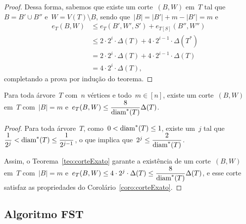 \begin{proof}
			Dessa forma, sabemos que existe um corte~$(B,W)$ em~$T$ tal
			que~${B=B'\cup B''}$ e~${W=V(T)\setminus B}$, sendo 
			que~${|B|=|B'| + m-|B'| = m}$ e
			\begin{align}
				e_T(B,W)&\le e_T(B',W',S') + e_{T[S]}(B'',W'') 
				\nonumber\\
				&\le 2\cdot2^i\cdot\Delta(T) + 4\cdot 2^{i-1}\cdot
				\Delta(T^*)\nonumber\\
				&= 2\cdot2^i\cdot\Delta(T) + 4\cdot 2^{i-1}\cdot
				\Delta(T)\nonumber\\
				&= 4\cdot 2^{i}\cdot\Delta(T), \nonumber
			\end{align}
			completando a prova por indução do teorema.
	\end{proof}

	\bigskip
	\bigskip

	\begin{coro}
	\label{coro:corteExato}
		Para toda árvore~$T$ com~$n$ vértices e todo~${m\in[n]}$, existe
		um corte~$(B,W)$ em~$T$ com~${|B|=m}$ 
		e~${e_T(B,W)\le \dfrac{8}{\mathrm{diam}^*(T)}\Delta(T)}$.
	\end{coro}

	\begin{proof}
		Para toda árvore~$T$,
		como~$0<\mathrm{diam}^*(T)\le 1$,
		existe um~$j$ tal
		que~${\dfrac{1}{2^j}}<\mathrm{diam}^*(T)\le \dfrac{1}{2^{j-1}}$,
		o que implica que~${2^j\le\dfrac{2}{\mathrm{diam}^*(T)}}$.

		Assim, o Teorema~\ref{teo:corteExato} garante a existência de um 
		corte~$(B,W)$ em~$T$ com~${|B|=m}$ 
		e~$e_T(B,W)\le 4\cdot 2^j\cdot\Delta(T)\le \dfrac{8}{\mathrm{diam}^*(T)} \Delta(T)$,
		e esse corte satisfaz as propriedades do 
		Corolário~\ref{coro:corteExato}. 
	\end{proof}

	\bigskip
	\bigskip
	\bigskip
	\bigskip
	\bigskip

	\subsection{Algoritmo FST}

